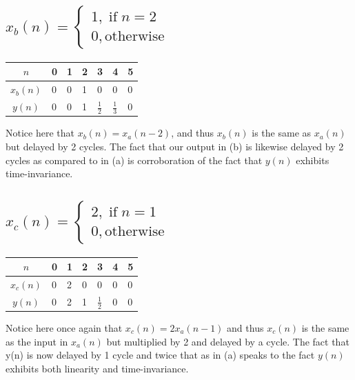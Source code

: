 \documentclass{article}
\renewcommand{\thesubsection}{\thesection.\alph{subsection}}
\begin{document}
\subsection[~\thesubsection]{$x_b(n) = \begin{cases} 1, \; \text{if} \; n = 2 \\ 0, \text{otherwise} \end{cases}$}

\begin{tabularx}{\linewidth}{| c || Y Y Y Y Y Y |}
	\hline
	$n$ & 0 & 1 & 2 & 3 & 4 & 5 \\
	\hline
	$x_b(n)$ & 0 & 0 & 1 & 0 & 0 & 0 \\
	$y(n)$ & 0 & 0 & 1 & $\tfrac{1}{2}$ & $\tfrac{1}{3}$ & 0 \\
	\hline
\end{tabularx}

\vspace{.3cm}

Notice here that $x_b(n) = x_a(n-2)$, and thus $x_b(n)$ is the same as $x_a(n)$ but delayed by 2 cycles. The fact that our output in (b) is likewise delayed by 2 cycles as compared to in (a) is corroboration of the fact that $y(n)$ exhibits time-invariance.

\subsection[~\thesubsection]{$x_c(n) = \begin{cases} 2, \; \text{if} \; n = 1 \\ 0, \text{otherwise} \end{cases}$}

\begin{tabularx}{\linewidth}{| c || Y Y Y Y Y Y |}
	\hline
	$n$ & 0 & 1 & 2 & 3 & 4 & 5 \\
	\hline
	$x_c(n)$ & 0 & 2 & 0 & 0 & 0 & 0 \\
	$y(n)$ & 0 & 2 & 1 & $\tfrac{1}{2}$ & 0 & 0 \\
	\hline
\end{tabularx}

\vspace{.3cm}

Notice here once again that $x_c(n) = 2x_a(n-1)$ and thus $x_c(n)$ is the same as the input in $x_a(n)$ but multiplied by 2 and delayed by a cycle. The fact that y(n) is now delayed by 1 cycle and twice that as in (a) speaks to the fact $y(n)$ exhibits both linearity and time-invariance.
\end{document}
